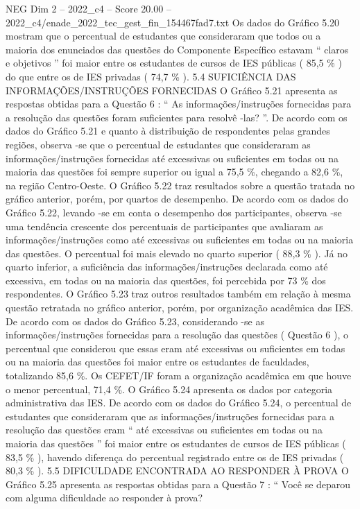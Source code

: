 \begin{textsample}{NEG Dim 2 – 2022\_c4 – Score 20.00 – 2022\_c4/enade\_2022\_tec\_gest\_fin\_154467fad7.txt}
Os dados do Gráfico 5.20 mostram que o percentual de estudantes que consideraram que todos ou a maioria dos enunciados das questões do Componente Específico estavam “ claros e objetivos ” foi maior entre os estudantes de cursos de IES públicas ( 85,5 \% ) do que entre os de IES privadas ( 74,7 \% ). 5.4 SUFICIÊNCIA DAS INFORMAÇÕES/INSTRUÇÕES FORNECIDAS O Gráfico 5.21 apresenta as respostas obtidas para a Questão 6 : “ As informações/instruções fornecidas para a resolução das questões foram suficientes para resolvê -las? ”.
De acordo com os dados do Gráfico 5.21 e quanto à distribuição de respondentes pelas grandes regiões, observa -se que o percentual de estudantes que consideraram as informações/instruções fornecidas até excessivas ou suficientes em todas ou na maioria das questões foi sempre superior ou igual a 75,5 \%, chegando a 82,6 \%, na região Centro-Oeste.
O Gráfico 5.22 traz resultados sobre a questão tratada no gráfico anterior, porém, por quartos de desempenho.
De acordo com os dados do Gráfico 5.22, levando -se em conta o desempenho dos participantes, observa -se uma tendência crescente dos percentuais de participantes que avaliaram as informações/instruções como até excessivas ou suficientes em todas ou na maioria das questões.
O percentual foi mais elevado no quarto superior ( 88,3 \% ).
Já no quarto inferior, a suficiência das informações/instruções declarada como até excessiva, em todas ou na maioria das questões, foi percebida por 73 \% dos respondentes.
O Gráfico 5.23 traz outros resultados também em relação à mesma questão retratada no gráfico anterior, porém, por organização acadêmica das IES.
De acordo com os dados do Gráfico 5.23, considerando -se as informações/instruções fornecidas para a resolução das questões ( Questão 6 ), o percentual que considerou que essas eram até excessivas ou suficientes em todas ou na maioria das questões foi maior entre os estudantes de faculdades, totalizando 85,6 \%.
Os CEFET/IF foram a organização acadêmica em que houve o menor percentual, 71,4 \%.
O Gráfico 5.24 apresenta os dados por categoria administrativa das IES.
De acordo com os dados do Gráfico 5.24, o percentual de estudantes que consideraram que as informações/instruções fornecidas para a resolução das questões eram “ até excessivas ou suficientes em todas ou na maioria das questões ” foi maior entre os estudantes de cursos de IES públicas ( 83,5 \% ), havendo diferença do percentual registrado entre os de IES privadas ( 80,3 \% ). 5.5 DIFICULDADE ENCONTRADA AO RESPONDER À PROVA O Gráfico 5.25 apresenta as respostas obtidas para a Questão 7 : “ Você se deparou com alguma dificuldade ao responder à prova?

\end{textsample}

